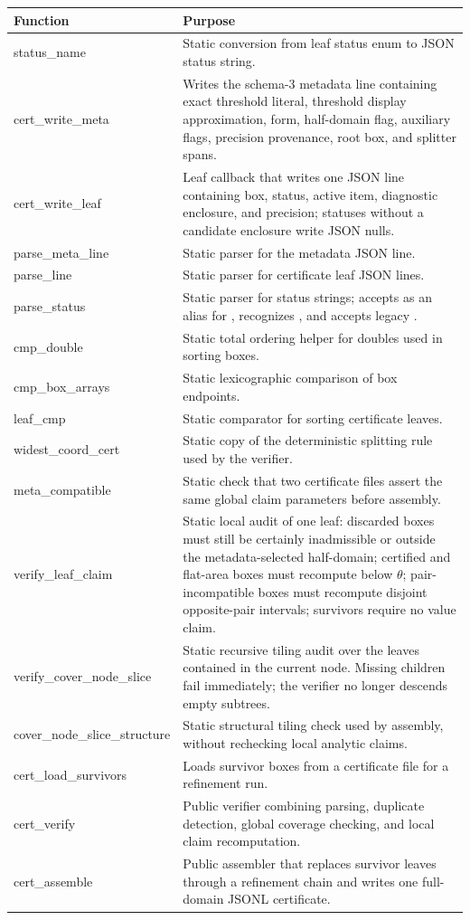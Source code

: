 \documentclass[11pt]{article}
\DeclareRobustCommand{\code}[1]{\texttt{\detokenize{#1}}}
\begin{document}
\begin{longtable}{>{\ttfamily}p{}p{}}
\toprule
Function & Purpose \\
\midrule
\endhead
status\_name & Static conversion from leaf status enum to JSON status string. \\
cert\_write\_meta & Writes the schema-3 metadata line containing exact threshold literal, threshold display approximation, form, half-domain flag, auxiliary flags, precision provenance, root box, and splitter spans. \\
cert\_write\_leaf & Leaf callback that writes one JSON line containing box, status, active item, diagnostic enclosure, and precision; statuses without a candidate enclosure write JSON nulls. \\
parse\_meta\_line & Static parser for the metadata JSON line. \\
parse\_line & Static parser for certificate leaf JSON lines. \\
parse\_status & Static parser for status strings; accepts \code{low} as an alias for \code{certified}, recognizes \code{pair\_incompatible}, and accepts legacy \code{nonoptimal}. \\
cmp\_double & Static total ordering helper for doubles used in sorting boxes. \\
cmp\_box\_arrays & Static lexicographic comparison of box endpoints. \\
leaf\_cmp & Static comparator for sorting certificate leaves. \\
widest\_coord\_cert & Static copy of the deterministic splitting rule used by the verifier. \\
meta\_compatible & Static check that two certificate files assert the same global claim parameters before assembly. \\
verify\_leaf\_claim & Static local audit of one leaf: discarded boxes must still be certainly inadmissible or outside the metadata-selected half-domain; certified and flat-area boxes must recompute below \(\theta\); pair-incompatible boxes must recompute disjoint opposite-pair intervals; survivors require no value claim. \\
verify\_cover\_node\_slice & Static recursive tiling audit over the leaves contained in the current node.  Missing children fail immediately; the verifier no longer descends empty subtrees. \\
cover\_\allowbreak node\_\allowbreak slice\_\allowbreak structure & Static structural tiling check used by assembly, without rechecking local analytic claims. \\
cert\_load\_survivors & Loads survivor boxes from a certificate file for a refinement run. \\
cert\_verify & Public verifier combining parsing, duplicate detection, global coverage checking, and local claim recomputation. \\
cert\_assemble & Public assembler that replaces survivor leaves through a refinement chain and writes one full-domain JSONL certificate. \\
\bottomrule
\end{longtable}
\end{document}
